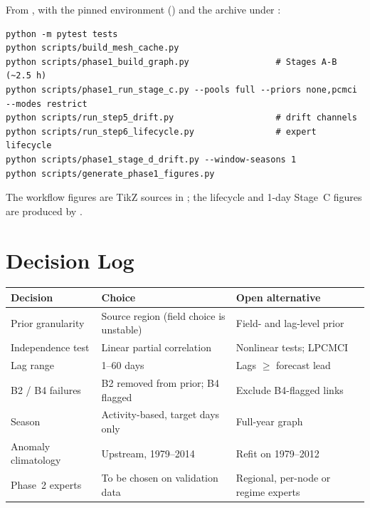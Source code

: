 From , with the pinned environment () and the archive under :
\begin{lstlisting}
python -m pytest tests
python scripts/build_mesh_cache.py
python scripts/phase1_build_graph.py                 # Stages A-B (~2.5 h)
python scripts/phase1_run_stage_c.py --pools full --priors none,pcmci --modes restrict
python scripts/run_step5_drift.py                    # drift channels
python scripts/run_step6_lifecycle.py                # expert lifecycle
python scripts/phase1_stage_d_drift.py --window-seasons 1
python scripts/generate_phase1_figures.py
\end{lstlisting}
The workflow figures are TikZ sources in ; the lifecycle and 1-day Stage~C figures are produced by .

\section{Decision Log}

\begin{small}
\renewcommand{\arraystretch}{1.15}
\begin{tabular}{p{3.6cm}p{5.6cm}p{4.8cm}}
\toprule
\textbf{Decision} & \textbf{Choice} & \textbf{Open alternative} \\
\midrule
Prior granularity & Source region (field choice is unstable) & Field- and lag-level prior \\
Independence test & Linear partial correlation & Nonlinear tests; LPCMCI \\
Lag range & 1--60 days & Lags $\ge$ forecast lead \\
B2 / B4 failures & B2 removed from prior; B4 flagged & Exclude B4-flagged links \\
Season & Activity-based, target days only & Full-year graph \\
Anomaly climatology & Upstream, 1979--2014 & Refit on 1979--2012 \\
Phase~2 experts & To be chosen on validation data & Regional, per-node or regime experts \\
\bottomrule
\end{tabular}
\end{small}
